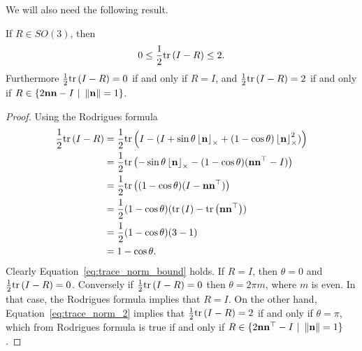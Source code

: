 We will also need the following result.
\begin{lemma} \label{lem:trace_norm_bound}
If $R\in SO(3)$, then 
\begin{equation}\label{eq:trace_norm_bound}
0 \leq \frac{1}{2}\trace{I-R} \leq 2.
\end{equation}
Furthermore $\frac{1}{2}\text{tr}\left(I-R\right)=0$ if and only if $R=I$, and $\frac{1}{2}\text{tr}\left(I-R\right)=2$ if and only if $R\in\{2\mathbf{n}\mathbf{n}-I ~|~ \left\|\mathbf{n}\right\|=1\}$.
\end{lemma}
\begin{proof}
Using the Rodrigues formula
\begin{align}
\frac{1}{2}\trace{I-R} &= \frac{1}{2}\trace{I-(I+\sin\theta\ss{\nbf}+(1-\cos\theta)\ss{\nbf}^2)} \notag \\
	&= \frac{1}{2}\trace{-\sin\theta\ss{\nbf}-(1-\cos\theta)(\nbf\nbf^\top-I)} \notag \\
	&= \frac{1}{2}\trace{(1-\cos\theta)(I-\nbf\nbf^\top)} \notag \\
	&= \frac{1}{2}(1-\cos\theta)(\trace{I}-\trace{\nbf\nbf^\top}) \notag \\
	&= \frac{1}{2}(1-\cos\theta)(3-1) \notag \\
	&= 1-\cos\theta. \label{eq:trace_norm_2}
\end{align}
Clearly Equation~\eqref{eq:trace_norm_bound} holds.  If $R=I$, then $\theta=0$ and $\frac{1}{2}\text{tr}\left(I-R\right)=0$.  Conversely if $\frac{1}{2}\text{tr}\left(I-R\right)=0$ then $\theta = 2\pi m$, where $m$ is even.  In that case, the Rodrigues formula implies that $R=I$.  On the other hand, Equation~\eqref{eq:trace_norm_2} implies that $\frac{1}{2}\text{tr}\left(I-R\right)=2$ if and only if $\theta=\pi$, which from Rodrigues formula is true if and only if $R\in\{2\mathbf{n}\mathbf{n}^\top-I ~|~ \left\|\mathbf{n}\right\|=1\}$.
\end{proof}

